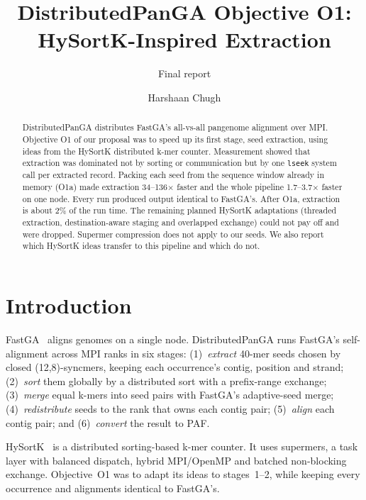 \documentclass[sigconf,nonacm]{acmart}
\begin{document}
\title{DistributedPanGA Objective O1: HySortK-Inspired Extraction}
\subtitle{Final report}

\author{Harshaan Chugh}

\begin{abstract}
DistributedPanGA distributes FastGA's all-vs-all pangenome alignment over MPI.
Objective O1 of our proposal was to speed up its first stage, seed extraction,
using ideas from the HySortK distributed k-mer counter.
Measurement showed that extraction was dominated not by sorting or
communication but by one \texttt{lseek} system call per extracted record.
Packing each seed from the sequence window already in memory (O1a) made
extraction 34--136$\times$ faster and the whole pipeline 1.7--3.7$\times$
faster on one node. Every run produced output identical to FastGA's.
After O1a, extraction is about 2\% of the run time. The remaining planned
HySortK adaptations (threaded extraction, destination-aware staging and
overlapped exchange) could not pay off and were dropped. Supermer compression
does not apply to our seeds. We also report which HySortK ideas transfer to
this pipeline and which do not.
\end{abstract}

\maketitle

\section{Introduction}

FastGA~\cite{fastga} aligns genomes on a single node. DistributedPanGA runs
FastGA's self-alignment across MPI ranks in six stages:
(1)~\emph{extract} 40-mer seeds chosen by closed (12,8)-syncmers, keeping
each occurrence's contig, position and strand;
(2)~\emph{sort} them globally by a distributed sort with a prefix-range
exchange;
(3)~\emph{merge} equal k-mers into seed pairs with FastGA's adaptive-seed
merge;
(4)~\emph{redistribute} seeds to the rank that owns each contig pair;
(5)~\emph{align} each contig pair; and
(6)~\emph{convert} the result to PAF.

HySortK~\cite{hysortk} is a distributed sorting-based k-mer counter. It uses
supermers, a task layer with balanced dispatch, hybrid MPI/OpenMP and batched
non-blocking exchange. Objective~O1 was to adapt its ideas to stages~1--2,
while keeping every occurrence and alignments identical to FastGA's.
\end{document}
